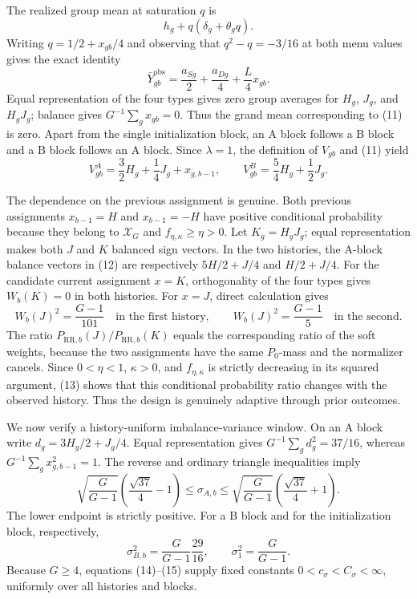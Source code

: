 The realized group mean at saturation \(q\) is
\[
 h_g+q(\delta_g+\theta_gq).
\]
Writing \(q=1/2+x_{gb}/4\) and observing that \(q^2-q=-3/16\) at both menu values gives the exact identity
\[
 \bar Y^{\mathrm{obs}}_{gb}
 =\frac{a_{Sg}}2+\frac{a_{Dg}}4+\frac L4x_{gb}.             \tag{11}
\]
Equal representation of the four types gives zero group averages for \(H_g\), \(J_g\), and \(H_gJ_g\); balance gives \(G^{-1}\sum_gx_{gb}=0\).  Thus the grand mean corresponding to (11) is zero.  Apart from the single initialization block, an A block follows a B block and a B block follows an A block.  Since \(\lambda=1\), the definition of \(V_{gb}\) and (11) yield
\[
 V_{gb}^{A}=\frac32H_g+\frac14J_g+x_{g,b-1},
 \qquad
 V_{gb}^{B}=\frac54H_g+\frac12J_g.                         \tag{12}
\]

The dependence on the previous assignment is genuine.  Both previous assignments \(x_{b-1}=H\) and \(x_{b-1}=-H\) have positive conditional probability because they belong to \(\mathcal X_G\) and \(f_{\eta,\kappa}\geq\eta>0\).  Let \(K_g=H_gJ_g\); equal representation makes both \(J\) and \(K\) balanced sign vectors.  In the two histories, the A-block balance vectors in (12) are respectively \(5H/2+J/4\) and \(H/2+J/4\).  For the candidate current assignment \(x=K\), orthogonality of the four types gives \(W_b(K)=0\) in both histories.  For \(x=J\), direct calculation gives
\[
 W_b(J)^2=\frac{G-1}{101}
 \quad\text{in the first history},
 \qquad
 W_b(J)^2=\frac{G-1}{5}
 \quad\text{in the second}.                               \tag{13}
\]
The ratio \(P_{\mathrm{RR},b}(J)/P_{\mathrm{RR},b}(K)\) equals the corresponding ratio of the soft weights, because the two assignments have the same \(P_0\)-mass and the normalizer cancels.  Since \(0<\eta<1\), \(\kappa>0\), and \(f_{\eta,\kappa}\) is strictly decreasing in its squared argument, (13) shows that this conditional probability ratio changes with the observed history.  Thus the design is genuinely adaptive through prior outcomes.

We now verify a history-uniform imbalance-variance window.  On an A block write \(d_g=3H_g/2+J_g/4\).  Equal representation gives
\(G^{-1}\sum_gd_g^2=37/16\), whereas \(G^{-1}\sum_gx_{g,b-1}^2=1\).  The reverse and ordinary triangle inequalities imply
\[
 \sqrt{\frac G{G-1}}\left(\frac{\sqrt{37}}4-1\right)
 \leq\sigma_{A,b}
 \leq\sqrt{\frac G{G-1}}\left(\frac{\sqrt{37}}4+1\right). \tag{14}
\]
The lower endpoint is strictly positive.  For a B block and for the initialization block, respectively,
\[
 \sigma_{B,b}^2=\frac G{G-1}\frac{29}{16},
 \qquad
 \sigma_1^2=\frac G{G-1}.                                  \tag{15}
\]
Because \(G\geq4\), equations (14)--(15) supply fixed constants \(0<c_\sigma<C_\sigma<\infty\), uniformly over all histories and blocks.

